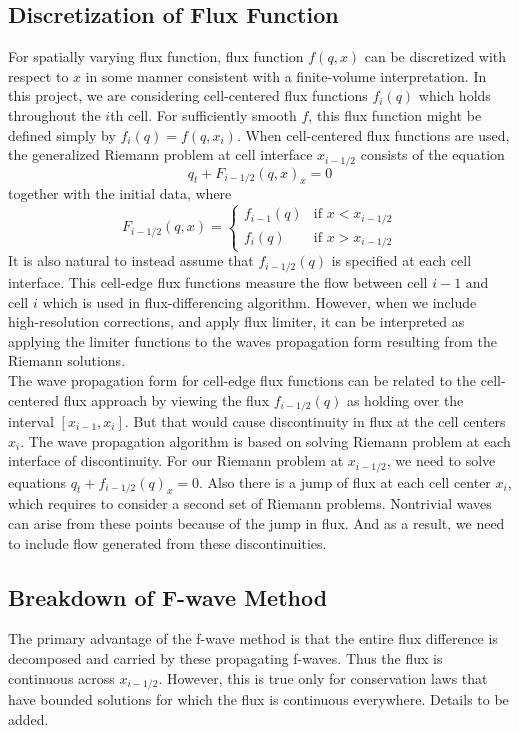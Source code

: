 \documentclass{article}
\begin{document}
\subsection{Discretization of Flux Function}
	For spatially varying flux function, flux function $f(q,x)$ can be discretized with respect to $x$ in some manner consistent with a finite-volume interpretation. In this project, we are considering cell-centered flux functions $f_i(q)$ which holds throughout the $i$th cell. For sufficiently smooth $f$, this flux function might be defined simply by $f_i(q)=f(q,x_i)$. When cell-centered flux functions are used, the generalized Riemann problem at cell interface $x_{i-1/2}$ consists of the equation
	\[
	q_t + F_{i-1/2}(q,x)_x=0
	\]
	together with the initial data, where
	\[
	F_{i-1/2}(q,x)=\begin{cases}f_{i-1}(q) & \text{if } x<x_{i-1/2}\\
	f_i(q) & \text{if } x>x_{i-1/2}\end{cases}
	\]
	It is also natural to instead assume that $f_{i-1/2}(q)$ is specified at each cell interface. This cell-edge flux functions measure the flow between cell $i-1$ and cell $i$ which is used in flux-differencing algorithm. However, when we include high-resolution corrections, and apply flux limiter, it can be interpreted as applying the limiter functions to the waves propagation form resulting from the Riemann solutions.\\
	
	\noindent The wave propagation form for cell-edge flux functions can be related to the cell-centered flux approach by viewing the flux $f_{i-1/2}(q)$ as holding over the interval $[x_{i-1},x_i]$. But that would cause discontinuity in flux at the cell centers $x_i$. The wave propagation algorithm is based on solving Riemann problem at each interface of discontinuity. For our Riemann problem at $x_{i-1/2}$, we need to solve equations $q_t+f_{i-1/2}(q)_x=0$. Also there is a jump of flux at each cell center $x_i$, which requires to consider a second set of Riemann problems. Nontrivial waves can arise from these points because of the jump in flux. And as a result, we need to include flow generated from these discontinuities.
\subsection{Breakdown of F-wave Method}
The primary advantage of the f-wave method is that the entire flux difference is decomposed and carried by these propagating f-waves. Thus the flux is continuous across $x_{i-1/2}$. However, this is true only for conservation laws that have bounded solutions for which the flux is continuous everywhere. Details to be added.
	
\end{document}
